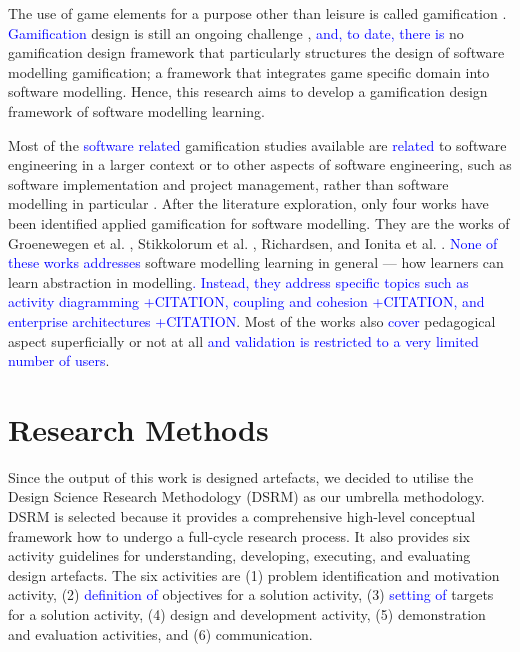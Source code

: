 \documentclass[runningheads,a4paper]{llncs}
\begin{document}
The use of game elements for a purpose other than leisure is called gamification \cite{deterding2011game}. \textcolor{blue}{Gamification} design is still an ongoing challenge \cite{Deterding2013}, \textcolor{blue}{and, to date, there is} no gamification design framework that particularly structures the design of software modelling gamification; a framework that integrates game specific domain into software modelling. Hence, this research aims to develop a gamification design framework of software modelling learning.

Most of the \textcolor{blue}{software related} gamification studies
available are \textcolor{blue}{related} to software engineering in a
larger context or to other aspects of software engineering, such as
software implementation and project management, rather than software
modelling in particular \cite{Pedreira2015}. After the literature
exploration, only four works have been identified applied gamification
for software modelling. They are the works of Groenewegen et
al. \cite{Groenewegen2010}, Stikkolorum et al. \cite{Stikkolorum2014},
Richardsen\cite{Richardsen2014}, and Ionita et
al. \cite{Ionita2015}. \textcolor{blue}{None of these works addresses}
software modelling learning in general --- how learners can learn
abstraction in modelling\textcolor{blue}{.  Instead, they address
  specific topics such as activity diagramming +CITATION, coupling and
  cohesion +CITATION, and enterprise architectures +CITATION}. Most of
the works also \textcolor{blue}{cover} pedagogical aspect
superficially or not at all\textcolor{blue}{ and validation is
  restricted to a very limited number of users}.

\section{Research Methods}
Since the output of this work is designed artefacts, we decided to utilise the Design Science Research Methodology (DSRM) \cite{peffers2007design} as our umbrella methodology. DSRM is selected because it provides a comprehensive high-level conceptual framework how to undergo a full-cycle research process. It also provides six activity guidelines for understanding, developing, executing, and evaluating design artefacts. The six activities are (1) problem identification and motivation activity, (2) \textcolor{blue}{definition of} objectives for a solution activity, (3) \textcolor{blue}{setting of} targets for a solution activity, (4) design and development activity, (5) demonstration and evaluation activities, and (6) communication. 
\end{document}
